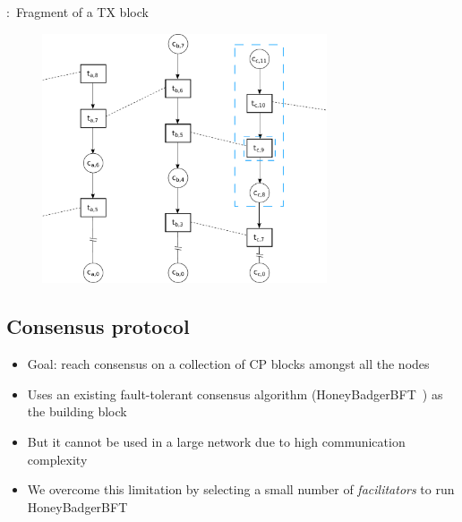 \documentclass{beamer}
\begin{document}
\begin{frame}{\subsecname:~Fragment of a TX block}
  \begin{figure}[h]
  \includegraphics[width=0.75\textwidth]{trustchain-good-cp-frag}
  \centering
  \end{figure}
\end{frame}

\subsection{Consensus protocol}

\begin{frame}{\subsecname}
  \begin{itemize}
    \item Goal: reach consensus on a collection of CP blocks amongst all the nodes
    \item Uses an existing fault-tolerant consensus algorithm (HoneyBadgerBFT~\cite{miller2016honey}) as the building block
    \item But it cannot be used in a large network due to high communication complexity
    \item We overcome this limitation by selecting a small number of \emph{facilitators} to run HoneyBadgerBFT
  \end{itemize}
\end{frame}
\end{document}
